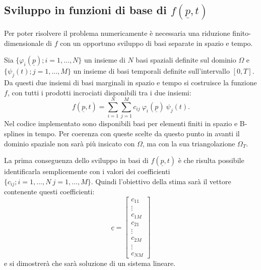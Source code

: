 \documentclass[a4paper,11pt,twoside,openright]{book}							%
\begin{document}
\subsection*{Sviluppo in funzioni di base di $f(\underline p,t)$}

Per poter risolvere il problema numericamente è necessaria una riduzione finito-dimensionale di $f$ con un opportuno sviluppo di basi separate in spazio e tempo.

Sia $\{\varphi_i(\underline p); i=1, ... , N\}$ un insieme di $N$ basi spaziali definite sul dominio $\Omega$ e $\{\psi_j(t); j=1, ... , M\}$ un insieme di basi temporali definite sull'intervallo $[0,T]$. Da questi due insiemi di basi marginali in spazio e tempo si costruisce la funzione $f$, con tutti i prodotti incrociati disponibili tra i due insiemi:
\begin{equation} 
\label{eq:basisexp}
f(\underline p,t)=\sum_{i=1}^N \sum_{j=1}^M c_{ij}\ \varphi_i(\underline p)\ \psi_j(t) .
\end{equation}
Nel codice implementato sono disponibili basi per elementi finiti in spazio e B-splines in tempo. Per coerenza con queste scelte da questo punto in avanti il dominio spaziale non sarà più insicato con $\Omega$, ma con la sua triangolazione $\Omega_T$.

La prima conseguenza dello sviluppo in basi di $f(\underline p,t)$ è che risulta possibile identificarla semplicemente con i valori dei coefficienti $\{c_{ij}; i=1, ... , N\ j=1, ... , M\}$. Quindi l'obiettivo della stima sarà il vettore contenente questi coefficienti:
\begin{equation}
\underline c =
\begin{bmatrix}
c_{11}  \\
\vdots\\
c_{1M}  \\
c_{21}  \\
\vdots\\
c_{2M}  \\
\vdots\\
c_{NM}
\end{bmatrix}
\end{equation}
e si dimostrerà che sarà soluzione di un sistema lineare.
\end{document}
